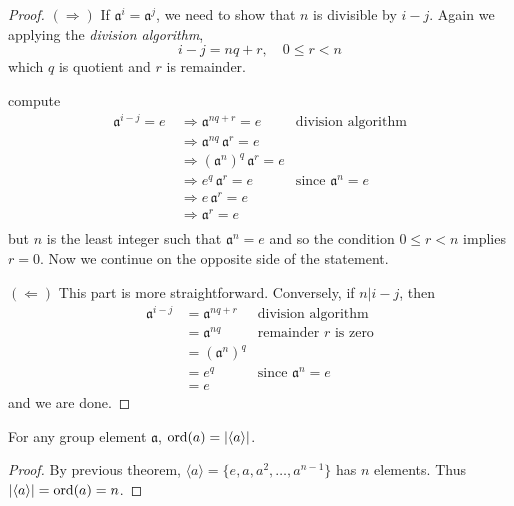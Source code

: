 \begin{proof}
    $(\Rightarrow)$ If $\mathfrak{a}^i = \mathfrak{a}^j$, we need to show that $n$ is divisible by $i - j$. Again we 
    applying the \textit{division algorithm}, 
    \[
        i - j = nq + r, \quad 0 \leq r < n
    \]
    which $q$ is quotient and $r$ is remainder.

    compute 
    \begin{align*}
        \mathfrak{a}^{i-j} = e \> &\Rightarrow \mathfrak{a}^{nq+r} = e & \text{division algorithm}\\
        &\Rightarrow \mathfrak{a}^{nq}\,  \mathfrak{a}^{r} = e\\
        &\Rightarrow (\mathfrak{a}^{n})^q \, \mathfrak{a}^{r} = e\\
        &\Rightarrow e^q \, \mathfrak{a}^{r} = e & \text{since } \mathfrak{a}^n = e\\
        &\Rightarrow e \, \mathfrak{a}^{r} = e\\
        &\Rightarrow \mathfrak{a}^{r} = e\\
    \end{align*}
    but $n$ is the least integer such that $\mathfrak{a}^n = e$ and so the condition $0 \leq r < n$ implies 
    $r = 0$. Now we continue on the opposite side of the statement.

    $(\Leftarrow)$ This part is more straightforward. Conversely, if $n|i-j$, then 
    \begin{align*}
        \mathfrak{a}^{i-j} &= \mathfrak{a}^{nq+r} & \text{division algorithm}\\ 
        &= \mathfrak{a}^{nq} & \text{remainder } r \text{ is zero}\\ 
        &= (\mathfrak{a}^n)^q\\
        &= e^q & \text{since } \mathfrak{a}^n = e\\
        &= e
    \end{align*}
    and we are done.
\end{proof}

\begin{corollary}
    For any group element $\mathfrak{a}$, $\operatorname{ord}(a) = |\langle a \rangle|$.
\end{corollary}
\begin{proof}
    By previous theorem, $\langle a \rangle = \{e, a, a^2, \ldots, a^{n-1}\}$ has $n$ elements. Thus 
    $|\langle a \rangle| = \operatorname{ord}(a) = n$. 
\end{proof}

